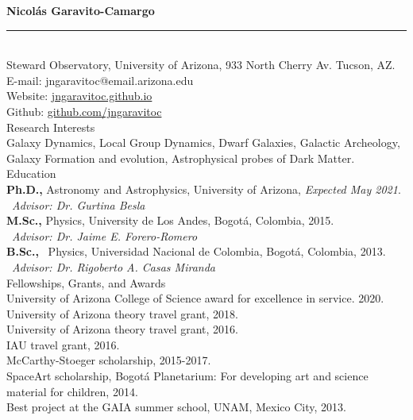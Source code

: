 \documentclass[UTF8]{article}
\begin{document}
\indent \textbf{\LARGE Nicol\'as Garavito-Camargo}\\
\indent \rule{17cm}{0.4pt}\\

\indent\indent Steward Observatory, University of Arizona, 933 North Cherry Av. Tucson, AZ.\\
\indent\indent E-mail: jngaravitoc@email.arizona.edu\\ 
\indent\indent Website: \href{http://jngaravitoc.github.io/Garavito-Camargo}{jngaravitoc.github.io}\\
\indent\indent Github: \href{http://www.github.com/jngaravitoc}{github.com/jngaravitoc} \\

{\Large Research Interests}\\

\indent\indent Galaxy Dynamics, Local Group Dynamics, Dwarf Galaxies, Galactic
Archeology, Galaxy Formation and evolution, 
\indent\indent Astrophysical probes of Dark
Matter.\\


{\Large Education}\\


\indent\indent \textbf{Ph.D.,} Astronomy and Astrophysics, University of
Arizona, \textit{Expected May 2021}.\\
\indent\indent\indent\indent \ \textit{Advisor: Dr. Gurtina Besla}\\

\indent\indent\textbf{M.Sc.,}  Physics, University de Los Andes, Bogot\'a, Colombia, 2015.\\
\indent\indent\indent\indent \ \textit{Advisor: Dr. Jaime E. Forero-Romero}\\

\indent\indent\textbf{B.Sc.,} \  Physics, Universidad Nacional de Colombia, Bogot\'a, Colombia, 2013.\\
\indent\indent\indent\indent \ \textit{Advisor: Dr. Rigoberto A. Casas Miranda}\\

{\Large{Fellowships, Grants, and Awards}}\\

\indent\indent University of Arizona College of Science award for excellence in service. 2020. \\
\indent\indent University of Arizona theory travel grant, 2018. \\
\indent\indent University of Arizona theory travel grant, 2016. \\
\indent\indent IAU travel grant, 2016.\\
\indent\indent McCarthy-Stoeger scholarship, 2015-2017.\\
\indent\indent SpaceArt scholarship, Bogot\'a Planetarium: For developing art and science material for children, 2014. \\
\indent\indent Best project at the GAIA summer school, UNAM, Mexico City, 2013.\\
\end{document}
